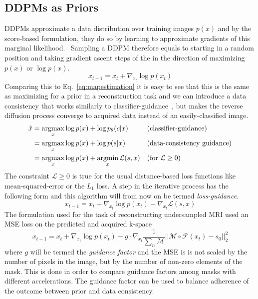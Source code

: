 \subsection{DDPMs as Priors}
\label{sec:lossguidance}
DDPMs approximate a data distribution over training images $p(x)$ and by the score-based formulation, they do so by learning to approximate gradients of this marginal likelihood.~\autocite{song2020generative} Sampling a DDPM therefore equals to starting in a random position and taking gradient ascent steps of the in the direction of maximizing $p(x)$ or $\log p(x)$.
\begin{equation}
    \label{eq:ddpmiteration}
    x_{t-1} = x_{t} + \nabla_{x_t} \log p(x_t)
\end{equation}
Comparing this to Eq.~\ref{eq:mapestimation} it is easy to see that this is the same as maximizing for a prior in a reconstruction task and we can introduce a data consistency that works similarly to classifier-guidance~\autocite{dhariwal2021diffusion}, but makes the reverse diffusion process converge to acquired data instead of an easily-classified image.
\begin{align}
    \hat{x} & = \operatorname*{argmax}_x \log p(x) + \log p_{\theta}(c|x)        &  & \text{(classifier-guidance)}       \\
            & = \operatorname*{argmax}_x \log p(x) + \log p(s|x)                 &  & \text{(data-consistency guidance)} \\
            & = \operatorname*{argmax}_x \log p(x) + \operatorname*{argmin}_x \mathcal{L}(s, x) &  & \text{(for $\mathcal{L} \geq 0$)}  \\
\end{align}
The constraint $\mathcal{L} \geq 0$ is true for the usual distance-based loss functions like mean-squared-error or the $L_1$ loss. A step in the iterative process has the following form and this algorithm will from now on be termed \textit{loss-guidance}.
\begin{equation}
    x_{t-1} = x_{t} + \nabla_{x_t} \log p(x_t) - \nabla_{x_t} \mathcal{L}(s, x)
\end{equation}
The formulation used for the task of reconstructing undersampled MRI used an MSE loss on the predicted and acquired k-space
\begin{equation}
    x_{t-1} = x_{t} + \nabla_{x_t} \log p(x_t) - g \cdot \nabla_{x_t} \frac{1}{\sum_n \mathcal{M}}||\mathcal{M} \circ \mathcal{F}(x_t) - s_0||_2^2
\end{equation}
where $g$ will be termed the \textit{guidance factor} and the MSE is is not scaled by the number of pixels in the image, but by the number of non-zero elements of the mask. This is done in order to compare guidance factors among masks with different accelerations. The guidance factor can be used to balance adherence of the outcome between prior and data consistency.

